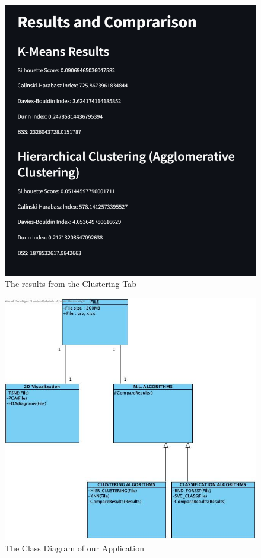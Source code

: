 \documentclass[unnumsec,webpdf,contemporary,large]{oup-authoring-template}%
\theoremstyle{thmstyleone}%
\theoremstyle{thmstyletwo}%
\theoremstyle{thmstylethree}%
\begin{document}
\begin{figure}
    \centering
    \includegraphics[width=1\linewidth]{clustering-resultsfinal.png}
    \caption{The results from the Clustering Tab}
    \label{fig:clustering-results}
\end{figure}

\begin{figure}
    \centering
    \includegraphics[width=1\linewidth]{Class Diagram.jpg}
    \caption{The Class Diagram of our Application}
    \label{fig:class-diagram}
\end{figure}
\end{document}
